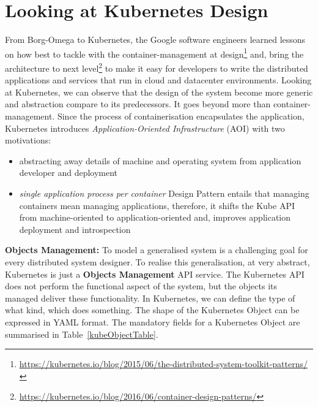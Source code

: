 \section{Looking at Kubernetes Design}
\label{kubeDesign}
From Borg-Omega to Kubernetes, the Google software engineers learned lessons \parencite{44843} on how best to tackle with the container-management at design\footnote{\url{https://kubernetes.io/blog/2015/06/the-distributed-system-toolkit-patterns/}} and, bring the architecture to next level\footnote{\url{https://kubernetes.io/blog/2016/06/container-design-patterns/}} to make it easy for developers to write the distributed applications and services that run in cloud and datacenter environments. Looking at Kubernetes, we can observe that the design of the system become more generic and abstraction compare to its predecessors. It goes beyond more than container-management. Since the process of containerisation encapsulates the application, Kubernetes introduces \textit{Application-Oriented Infrastructure} (AOI) with two motivations:
\begin{itemize}
\item abstracting away details of machine and operating system from application developer and deployment
\item \emph{single application process per container} Design Pattern entails that managing containers mean managing applications, therefore, it shifts the Kube API from machine-oriented to application-oriented and, improves application deployment and introspection 
\end{itemize}

\noindent\textbf{Objects Management:} \quad To model a generalised system is a challenging goal for every distributed system designer. To realise this generalisation, at very abstract, Kubernetes is just a \textbf{Objects Management} API service. The Kubernetes API does not perform the functional aspect of the system, but the objects its managed deliver these functionality. In Kubernetes, we can define the type of what kind, which does something. The shape of the Kubernetes Object can be expressed in YAML format. The mandatory fields for a Kubernetes Object are summarised in Table~\ref{kubeObjectTable}.

